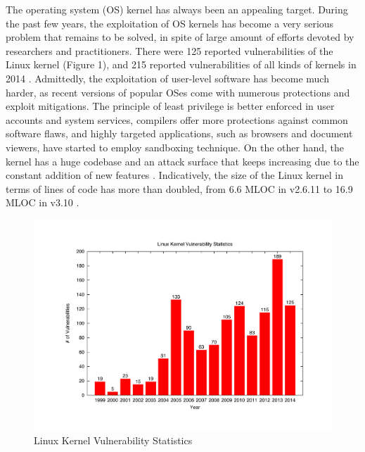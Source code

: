 \par
The operating system (OS) kernel has always been an appealing target. During the past few years, the exploitation of OS kernels has become a very serious problem that remains to be solved, in spite of large amount of efforts devoted by researchers and practitioners. There were 125 reported vulnerabilities of the Linux kernel \cite{CVE:14} (Figure 1), and 215 reported vulnerabilities of all kinds of kernels in 2014 \cite{NVD:14}. Admittedly, the exploitation of user-level software has become much harder, as recent versions of popular OSes come with numerous protections and exploit mitigations. The principle of least privilege is better enforced in user accounts and system services, compilers offer more protections against common software flaws, and highly targeted applications, such as browsers and document viewers, have started to employ sandboxing technique. On the other hand, the kernel has a huge codebase and an attack surface that keeps increasing due to the constant addition of new features \cite{Metrics:13}. Indicatively, the size of the Linux kernel in terms of lines of code has more than doubled, from 6.6 MLOC in v2.6.11 to 16.9 MLOC in v3.10 \cite{Linux:13}.


\begin{figure}[h]
\centering
\includegraphics[width=1.0\columnwidth]{diagram/linux_kernel_vul_total_stats.pdf}
\caption{Linux Kernel Vulnerability Statistics }
\label{fig:arch}
\end{figure}



